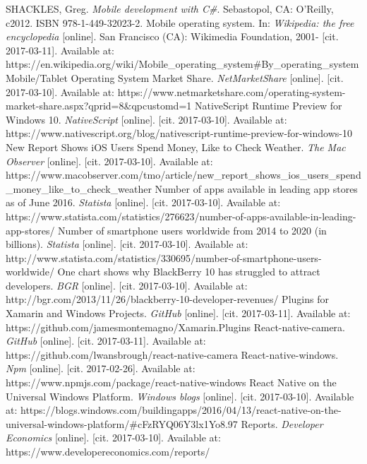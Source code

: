 \documentclass[english,master,public,dept460,male,cpdeclaration,oneside]{diploma}
\begin{document}
\begin{thebibliography}{99}
	 SHACKLES, Greg. \textit{Mobile development with C\#}. Sebastopol, CA: O'Reilly, c2012. ISBN 978-1-449-32023-2.
	 Mobile operating system. In: \textit{Wikipedia: the free encyclopedia} [online]. San Francisco (CA): Wikimedia Foundation, 2001- [cit. 2017-03-11]. Available at: https://en.wikipedia.org/wiki/Mobile\_operating\_system\#By\_operating\_system
	 Mobile/Tablet Operating System Market Share. \textit{NetMarketShare} [online]. [cit. 2017-03-10]. Available at: https://www.netmarketshare.com/operating-system-market-share.aspx?qprid=8\&qpcustomd=1
	 NativeScript Runtime Preview for Windows 10. \textit{NativeScript} [online]. [cit. 2017-03-10]. Available at: https://www.nativescript.org/blog/nativescript-runtime-preview-for-windows-10
	 New Report Shows iOS Users Spend Money, Like to Check Weather. \textit{The Mac Observer} [online]. [cit. 2017-03-10]. Available at: https://www.macobserver.com/tmo/article/new\_report\_shows\_ios\_users\_spend\_money\_like\_to\_check\_weather
	 Number of apps available in leading app stores as of June 2016. \textit{Statista} [online]. [cit. 2017-03-10]. Available at: https://www.statista.com/statistics/276623/number-of-apps-available-in-leading-app-stores/
	 Number of smartphone users worldwide from 2014 to 2020 (in billions). \textit{Statista} [online]. [cit. 2017-03-10]. Available at: http://www.statista.com/statistics/330695/number-of-smartphone-users-worldwide/
	 One chart shows why BlackBerry 10 has struggled to attract developers. \textit{BGR} [online]. [cit. 2017-03-10]. Available at: http://bgr.com/2013/11/26/blackberry-10-developer-revenues/
	 Plugins for Xamarin and Windows Projects. \textit{GitHub} [online]. [cit. 2017-03-11]. Available at: https://github.com/jamesmontemagno/Xamarin.Plugins
	 React-native-camera. \textit{GitHub} [online]. [cit. 2017-03-11]. Available at: https://github.com/lwansbrough/react-native-camera
	 React-native-windows. \textit{Npm} [online]. [cit. 2017-02-26]. Available at: https://www.npmjs.com/package/react-native-windows
	 React Native on the Universal Windows Platform. \textit{Windows blogs} [online]. [cit. 2017-03-10]. Available at: https://blogs.windows.com/buildingapps/2016/04/13/react-native-on-the-universal-windows-platform/\#cFzRYQ06Y3lx1Yo8.97
	 Reports. \textit{Developer Economics} [online]. [cit. 2017-03-10]. Available at: https://www.developereconomics.com/reports/

\end{thebibliography}
\end{document}
